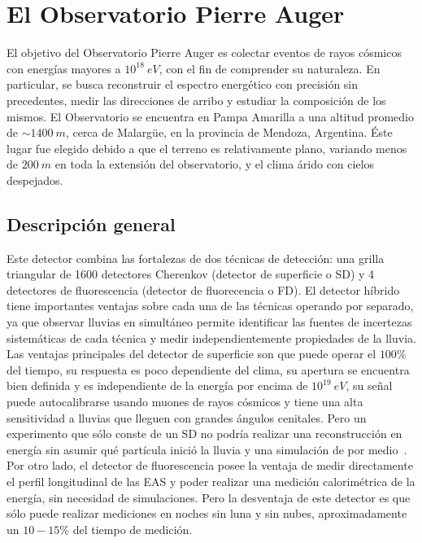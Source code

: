 \chapter{El Observatorio Pierre Auger}
\label{ch:detectorAuger}

El objetivo del Observatorio Pierre Auger es colectar eventos de rayos c\'osmicos con energ\'ias mayores a $10^{18}\ eV$, con el fin de comprender su naturaleza. En particular, se busca reconstruir el espectro energ\'etico con precisi\'on sin precedentes, medir las direcciones de arribo y estudiar la composici\'on de los mismos. El Observatorio se encuentra en Pampa Amarilla a una altitud promedio de $\sim 1400\ m$, cerca de Malarg\"ue, en la provincia de Mendoza, Argentina.
\'Este lugar fue elegido debido a que el terreno es relativamente plano, variando menos de $200\ m$ en toda la extensi\'on del observatorio, y el clima \'arido con cielos despejados. 

	\section{Descripción general}
	Este detector combina las fortalezas de dos t\'ecnicas de detecci\'on: una grilla triangular de 1600 detectores Cherenkov (detector de superficie o SD) y 4 detectores de fluorescencia (detector de fluorecencia o FD).
	El detector h\'ibrido tiene importantes ventajas sobre cada una de las t\'ecnicas operando por separado, ya que observar lluvias en simult\'aneo permite identificar las fuentes de incertezas sistem\'aticas de cada t\'ecnica y medir independientemente propiedades de la lluvia.
	Las ventajas principales del detector de superficie son que puede operar el $100 \%$ del tiempo, su respuesta es poco dependiente del clima, su apertura se encuentra bien definida y es independiente de la energ\'ia por encima de $10^{19}\ eV$, su se\~nal puede autocalibrarse usando muones de rayos c\'osmicos  y tiene una alta sensitividad a lluvias que lleguen con grandes \'angulos cenitales. 
	Pero un experimento que s\'olo conste de un SD no podr\'ia realizar una reconstrucci\'on en energ\'ia sin asumir qu\'e part\'icula inici\'o la lluvia y una simulaci\'on de por medio~\cite{busca_thesis}.
	Por otro lado, el detector de fluorescencia posee la ventaja de medir directamente el perfil longitudinal de las EAS y poder realizar una medici\'on calorim\'etrica de la energ\'ia, sin necesidad de simulaciones. Pero la desventaja de este detector es que s\'olo puede realizar mediciones en noches sin luna y sin nubes, aproximadamente un $10 - 15 \%$ del tiempo de medici\'on.
	

